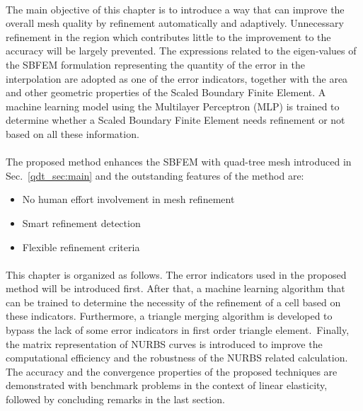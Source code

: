 \paragraph{}
The main objective of this chapter is to introduce a way that can improve the overall mesh quality by refinement automatically and adaptively.
Unnecessary refinement in the region which contributes little to the improvement to the accuracy will be largely prevented.
The expressions related to the eigen-values of the SBFEM formulation representing the quantity of the error in the interpolation are adopted as one of the error indicators, together with the area and other geometric properties of the Scaled Boundary Finite Element.
A machine learning model using the Multilayer Perceptron (MLP) is trained to determine whether a Scaled Boundary Finite Element needs refinement or not based on all these information.

\paragraph{}
The proposed method enhances the SBFEM with quad-tree mesh introduced in Sec.~\ref{qdt_sec:main} and the outstanding features of the method are:
\begin{itemize}
    \item No human effort involvement in mesh refinement
    \item Smart refinement detection
    \item Flexible refinement criteria
\end{itemize}

\paragraph{}
This chapter is organized as follows.
The error indicators used in the proposed method will be introduced first.
After that, a machine learning algorithm that can be trained to determine the necessity of the refinement of a cell based on these indicators.
Furthermore, a triangle merging algorithm is developed to bypass the lack of some error indicators in first order triangle element.\
Finally, the matrix representation of NURBS curves is introduced to improve the computational efficiency and the robustness of the NURBS related calculation.
The accuracy and the convergence properties of the proposed techniques are demonstrated with benchmark problems in the context of linear elasticity, followed by concluding remarks in the last section.

